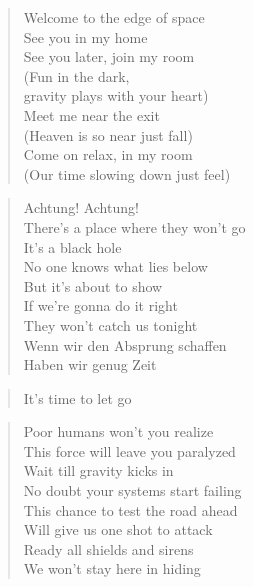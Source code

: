 

\begin{minipage}{0.6\textwidth}
    \begin{verse}
    Welcome to the edge of space \\
    See you in my home \\
    See you later, join my room \\
    (Fun in the dark,\\ gravity plays with your heart) \\
    Meet me near the exit \\
    (Heaven is so near just fall)\\
    Come on relax, in my room \\
    (Our time slowing down just feel)
    \end{verse}

    \begin{verse}
    Achtung! Achtung! \\
    There's a place where they won't go \\
    It's a black hole \\
    No one knows what lies below \\
    But it's about to show \\
    If we're gonna do it right \\
    They won't catch us tonight \\
    Wenn wir den Absprung schaffen \\
    Haben wir genug Zeit    
    \end{verse}

    \begin{verse}
    It's time to let go
    \end{verse}

\end{minipage}
\begin{minipage}{0.6\textwidth}

\begin{verse}
    Poor humans won’t you realize \\
    This force will leave you paralyzed \\
    Wait till gravity kicks in \\
    No doubt your systems start failing \\
    This chance to test the road ahead \\
    Will give us one shot to attack \\
    Ready all shields and sirens \\
    We won’t stay here in hiding 
    \end{verse}
\end{minipage}
\clearpage
